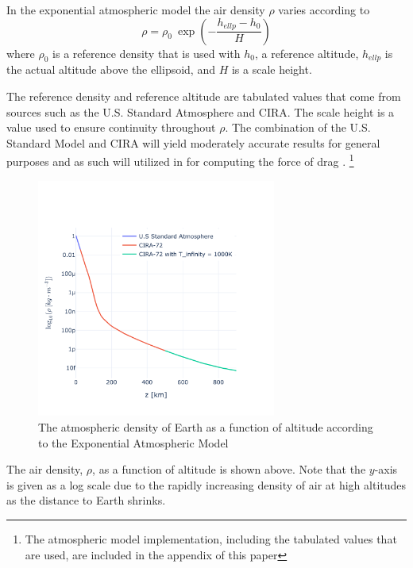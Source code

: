 \documentclass[a4paper, 12pt]{article}
\begin{document}
In the exponential atmospheric model the air density $\rho$ varies according to
\begin{equation}
	\rho = \rho_0\:\exp\left(-\frac{h_{ellp} - h_0}{H}\right)
\end{equation}
where $\rho_0$ is a reference density that is used with $h_0$,  a reference altitude,  $h_{ellp}$ is the actual altitude above the ellipsoid, and $H$ is a scale height.

The reference density and reference altitude are tabulated values that come from sources such as the U.S. Standard Atmosphere and CIRA. The scale height is a value used to ensure continuity throughout $\rho$. The combination of the U.S. Standard Model and CIRA will yield moderately accurate results for general purposes and as such will utilized in for computing the force of drag \citep{vallado_d._2013}. \footnote{The atmospheric model implementation, including the tabulated values that are used, are included in the appendix of this paper}

\begin{figure}[h]
	\centering     %
	\includegraphics[width=0.7\textwidth]{Atmospheric_Density_v_Altitude}
	\caption{The atmospheric density of Earth as a function of altitude according to the Exponential Atmospheric Model}
\end{figure}

The air density, $\rho$, as a function of altitude is shown above. Note that the $y$-axis is given as a log scale due to the rapidly increasing density of air at high altitudes as the distance to Earth shrinks.
\end{document}
